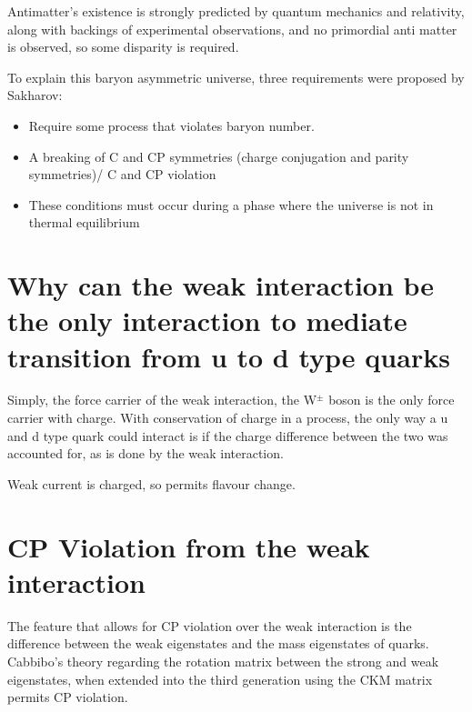 \documentclass[]{article}
\begin{document}
	Antimatter's existence is strongly predicted by quantum mechanics and relativity, along with backings of experimental observations, and no primordial anti matter is observed, so some disparity is required.
	
	To explain this baryon asymmetric universe, three requirements were proposed by Sakharov:
	
	\begin{itemize}
		\item Require some process that violates baryon number.
		\item A breaking of C and CP symmetries (charge conjugation and parity symmetries)/ C and CP violation
		\item These conditions must occur during a phase where the universe is not in thermal equilibrium
	\end{itemize}
	
\section{Why can the weak interaction be the only interaction to mediate transition from u to d type quarks}

	Simply, the force carrier of the weak interaction, the W$^\pm$ boson is the only force carrier with charge. With conservation of charge in a process, the only way a u and d type quark could interact is if the charge difference between the two was accounted for, as is done by the weak interaction.
	
	Weak current is charged, so permits flavour change.
	
\section{}
	
\section{}

\newpage

\section{CP Violation from the weak interaction}

	The feature that allows for CP violation over the weak interaction is the difference between the weak eigenstates and the mass eigenstates of quarks. Cabbibo's theory regarding the rotation matrix between the strong and weak eigenstates, when extended into the third generation using the CKM matrix permits CP violation.
	
\end{document}
